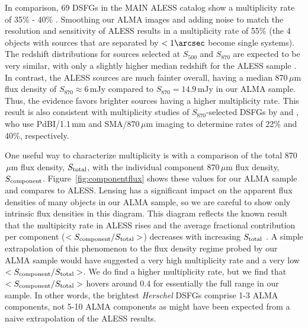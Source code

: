 \documentclass[iop]{emulateapj}
\begin{document}
In comparison, 69 DSFGs in the MAIN ALESS catalog show a multiplicity rate of
35\% - 40\% \citep{Hodge:2013qy}.  Smoothing our ALMA images and adding noise
to match the resolution and sensitivity of ALESS results in a multiplicity rate
of 55\% (the 4 objects with sources that are separated by $<1\arcsec$ become
single systems).  The redshift distributions for sources selected at $S_{500}$
and $S_{870}$ are expected to be very similar, with only a slightly higher
median redshift for the ALESS sample \citep[e.g., $z_{\rm med} = 2.0$ vs.
$z_{\rm med} = 2.2$; see][]{Zavala:2014lr}.  In contrast, the ALESS sources are
much fainter overall, having a median 870$\,\mu$m flux density of $S_{870}
\approx 6\,$mJy compared to $S_{870} =14.9\,$mJy in our ALMA sample.  Thus, the
evidence favors brighter sources having a higher multiplicity rate.  This
result is also consistent with multiplicity studies of $S_{870}$-selected DSFGs
by \citet{Smolcic:2012zl} and \citet{Barger:2012yg}, who use PdBI/1.1$\,$mm and
SMA/870$\,\mu$m imaging to determine rates of 22\% and 40\%, respectively.

One useful way to characterize multiplicity is with a comparison of the total
870$\,\mu$m flux density, $S_{\rm total}$, with the individual component
870$\,\mu$m flux density, $S_{\rm component}$.  Figure~\ref{fig:componentflux}
shows these values for our ALMA sample and compares to ALESS.  Lensing has a
significant impact on the apparent flux densities of many objects in our ALMA
sample, so we are careful to show only intrinsic flux densities in this
diagram.  This diagram reflects the known result that the multipicity rate in
ALESS rises and the average fractional contribution per component ($<S_{\rm
component}/S_{\rm total}>$) decreases with increasing $S_{\rm total}$
\citep{Hodge:2013qy}.  A simple extrapolation of this phenomenon to the flux
density regime probed by our ALMA sample would have suggested a very high
multiplicity rate and a very low $<S_{\rm component}/S_{\rm total}>$.  We do
find a higher multiplicity rate, but we find that $<S_{\rm component}/S_{\rm
total}>$ hovers around 0.4 for essentially the full range in our sample.  In
other words, the brightest {\it Herschel} DSFGs comprise 1-3 ALMA
components, not 5-10 ALMA components as might have been expected from a naive
extrapolation of the ALESS results.  
\end{document}
